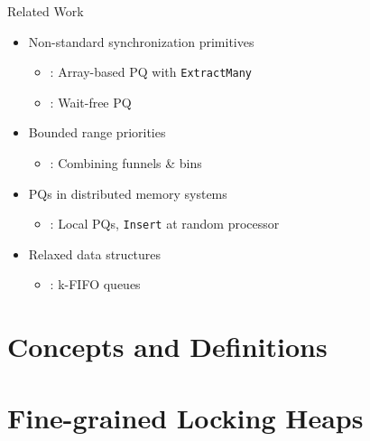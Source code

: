 \documentclass[usenames,dvipsnames]{beamer}
\begin{document}
\begin{frame}{Related Work}
\begin{itemize}
\item Non-standard synchronization primitives
    \begin{itemize}
    \item \citeauthor{liu2012lock}: Array-based PQ with \lstinline|ExtractMany|
    \item \citeauthor{israeli1993efficient}: Wait-free PQ
    \end{itemize}

\item Bounded range priorities
    \begin{itemize}
    \item \citeauthor{shavit1999scalable}: Combining funnels \& bins
    \end{itemize}

\item PQs in distributed memory systems
    \begin{itemize}
    \item \citeauthor{sanders1998randomized}: Local PQs, \lstinline|Insert| at random processor
    \end{itemize}

\item Relaxed data structures
    \begin{itemize}
    \item \citeauthor{kirsch2012fast}: k-FIFO queues
    \end{itemize}

\end{itemize}
\end{frame}

\section{Concepts and Definitions}

\section{Fine-grained Locking Heaps}
\end{document}
